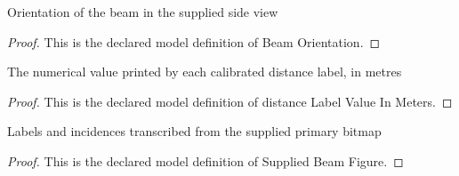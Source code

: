 \begin{definition}
  \label{def:physics:phyx-mini-0702:phyxminiproblems-problemphyxmini0702-beamorientation}
  Orientation of the beam in the supplied side view
\end{definition}
\begin{proof}
  This is the declared model definition of Beam Orientation.
\end{proof}
\begin{definition}
  \label{def:physics:phyx-mini-0702:phyxminiproblems-problemphyxmini0702-distancelabelvalueinmeters}
  The numerical value printed by each calibrated distance label, in metres
\end{definition}
\begin{proof}
  This is the declared model definition of distance Label Value In Meters.
\end{proof}
\begin{definition}
  \label{def:physics:phyx-mini-0702:phyxminiproblems-problemphyxmini0702-suppliedbeamfigure}
  Labels and incidences transcribed from the supplied primary bitmap
\end{definition}
\begin{proof}
  This is the declared model definition of Supplied Beam Figure.
\end{proof}

